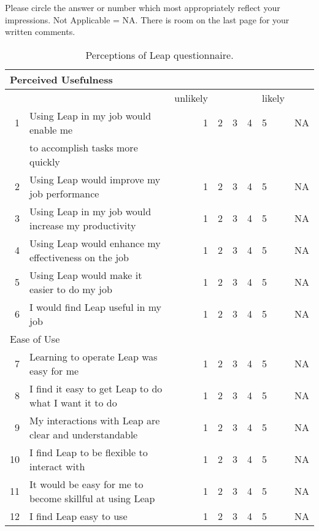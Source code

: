 
\label{sec:questionaire-ease}

Please circle the answer or number which most appropriately reflect your
impressions.  Not Applicable = NA.   There is room on the last page for your
written comments.
\begin{table}[htbp]
  \caption{Perceptions of Leap questionnaire.}  
  \begin{tabular}{rlrccclc}\\
    \hline
    \multicolumn{8}{l}{Perceived Usefulness}\\ \hline
    &&unlikely&&&&likely&\\ \hline
    1&Using Leap in my job would enable me&1&2&3&4&5&NA\\
    &to accomplish tasks more quickly\\ \hline
    2&Using Leap would improve my job performance&1&2&3&4&5&NA\\ \hline
    3&Using Leap in my job would increase my productivity&1&2&3&4&5&NA\\
    \hline
    4&Using Leap would enhance my effectiveness on the job&1&2&3&4&5&NA\\
    \hline
    5&Using Leap would make it easier to do my job&1&2&3&4&5&NA\\ \hline
    6&I would find Leap useful in my job&1&2&3&4&5&NA\\ \hline \hline
    \multicolumn{8}{l}{Ease of Use}\\ \hline
    7&Learning to operate Leap was easy for me&1&2&3&4&5&NA\\ \hline
    8&I find it easy to get Leap to do what I want it to do&1&2&3&4&5&NA\\
    \hline
    9&My interactions with Leap are clear and understandable&1&2&3&4&5&NA\\
    \hline
    10&I find Leap to be flexible to interact with&1&2&3&4&5&NA\\ \hline
    11&It would be easy for me to become skillful at using Leap&1&2&3&4&5&NA\\
    \hline
    12&I find Leap easy to use&1&2&3&4&5&NA\\ \hline 
  \end{tabular}
\end{table}

